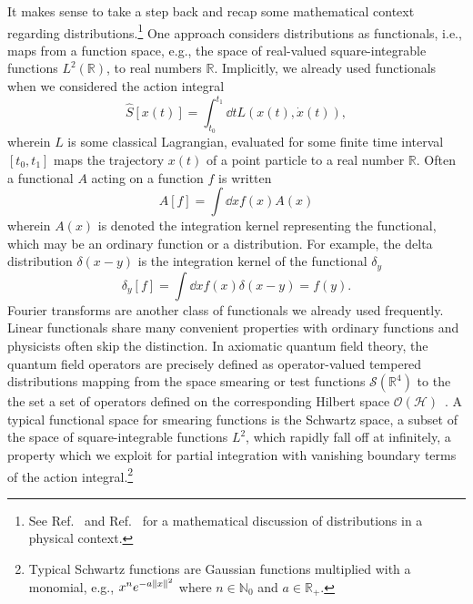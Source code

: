 It makes sense to take a step back and recap some mathematical context regarding distributions.\footnote{See Ref.~\cite[p.~590]{Zeidler2016} and Ref.~\cite[p.~193]{Mukhanov2007} for a mathematical discussion of distributions in a physical context.}
One approach considers distributions as functionals, i.e., maps from a function space, e.g., the space of real-valued square-integrable functions $L^2(\mathbb{R})$, to real numbers $\mathbb{R}$.
Implicitly, we already used functionals when we considered the action integral
\begin{equation}
	\hat{S}\left[x(t)\right]
	=
	\int_{t_0}^{t_1}\dd{t}
	L\left(x(t),\dot{x}(t)\right)
	,
\end{equation}
wherein $L$ is some classical Lagrangian, evaluated for some finite time interval $[t_0,t_1]$ maps the trajectory $x(t)$ of a point particle to a real number $\mathbb{R}$.
Often a functional $A$ acting on a function $f$ is written
\begin{equation}
	A[f]
	=
	\int\dd{x}
	f(x)A(x)
	\label{eq:functional}
\end{equation}
wherein $A(x)$ is denoted the integration kernel representing the functional, which may be an ordinary function or a distribution.
For example, the delta distribution $\delta(x-y)$ is the integration kernel of the functional $\delta_y$
\begin{equation}
	\delta_{y}[f]
	=
	\int\dd{x}
	f(x)
	\delta(x-y)
	=
	f(y)
	.
\end{equation}
Fourier transforms are another class of functionals we already used frequently.
Linear functionals share many convenient properties with ordinary functions and physicists often skip the distinction.
In axiomatic quantum field theory, the quantum field operators are precisely defined as operator-valued tempered distributions mapping from the space smearing or test functions $\mathcal{S}(\mathbb{R}^4)$ to the the set a set of operators defined on the corresponding Hilbert space $\mathcal{O}(\mathcal{H})$~\cite[p.~56]{Haag2012}.
A typical functional space for smearing functions is the Schwartz space, a subset of the space of square-integrable functions $L^2$, which rapidly fall off at infinitely, a property which we exploit for partial integration with vanishing boundary terms of the action integral.\footnote{Typical Schwartz functions are Gaussian functions multiplied with a monomial, e.g., $x^ne^{-a\lVert x\rVert^2}$ where $n\in\mathbb{N}_0$ and $a\in\mathbb{R}_+$.}

